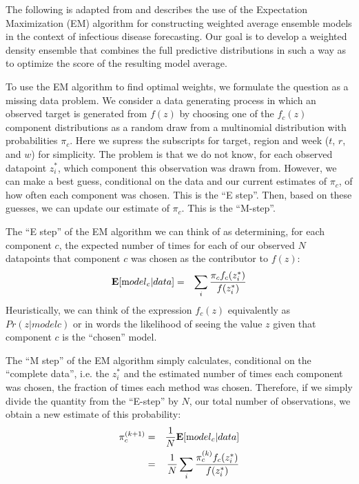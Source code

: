\documentclass{article}\usepackage[]{graphicx}\usepackage[]{color}
\begin{document}
The following is adapted from \cite{Rosenfeld1997,Rosenfeld2007} and describes the use of the Expectation Maximization (EM) algorithm for constructing weighted average ensemble models in the context of infectious disease forecasting.  
Our goal is to develop a weighted density ensemble that combines the full predictive distributions in such a way as to optimize the score of the resulting model average.


To use the EM algorithm to find optimal weights, we formulate the question as a missing data problem. 
We consider a data generating process in which an observed target is generated from $f(z)$ by choosing one of the $f_c(z)$ component distributions as a random draw from a multinomial distribution with probabilities $\pi_c$. 
Here we supress the subscripts for target, region and week ($t$, $r$, and $w$) for simplicity.
The problem is that we do not know, for each observed datapoint $z_i^*$, which component this observation was drawn from. 
However, we can make a best guess, conditional on the data and our current estimates of $\pi_c$, of how often each component was chosen. 
This is the ``E step''. Then, based on these guesses, we can update our estimate of $\pi_c$. This is the ``M-step''.

The ``E step'' of the EM algorithm we can think of as determining, for each component  $c$, the expected number of times for each of our observed $N$ datapoints that component $c$ was chosen as the contributor to $f(z)$:
\begin{eqnarray}
{\mathbf E}[ {\mbox model}_c |data ] %
 & = & \sum_i \frac{\pi_c f_c(z_i^*)}{f(z_i^*)} 
\end{eqnarray}
Heuristically, we can think of the expression $f_c(z)$ equivalently as $Pr(z| model c)$ or in words the likelihood of seeing the value $z$ given that component $c$ is the ``chosen'' model. 

The ``M step'' of the EM algorithm simply calculates, conditional on the ``complete data'', i.e. the $z^*_i$ and the estimated number of times each component was chosen, the fraction of times each method was chosen. Therefore, if we simply divide the quantity from the ``E-step'' by $N$, our total number of observations, we obtain a new estimate of this probability: 
\begin{eqnarray}
\pi_c^{(k+1)} & = & \frac{1}{N} {\mathbf E}[ {\mbox model}_c |data ] \\
& = & \frac{1}{N} \sum_i \frac{\pi^{(k)}_c f_c(z_i^*)}{f(z_i^*)} 
\end{eqnarray}
\end{document}
